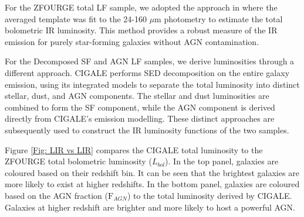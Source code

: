 For the ZFOURGE total LF sample, we adopted the approach in \cite{straatman_fourstar_2016} where the averaged \cite{wuyts_fireworks_2008} template was fit to the 24-160 $\mu$m photometry to estimate the total bolometric IR luminosity. This method provides a robust measure of the IR emission for purely star-forming galaxies without AGN contamination.

For the Decomposed SF and AGN LF samples, we derive luminosities through a different approach. CIGALE performs SED decomposition on the entire galaxy emission, using its integrated models to separate the total luminosity into distinct stellar, dust, and AGN components. The stellar and dust luminosities are combined to form the SF component, while the AGN component is derived directly from CIGALE's emission modelling. These distinct approaches are subsequently used to construct the IR luminosity functions of the two samples. 

Figure \ref{Fig: LIR vs LIR} compares the CIGALE total luminosity to the ZFOURGE total bolometric luminosity ($L_{bol}$). In the top panel, galaxies are coloured based on their redshift bin. It can be seen that the brightest galaxies are more likely to exist at higher redshifts. In the bottom panel, galaxies are coloured based on the AGN fraction ($\mathrm{F}_{AGN}$) to the total luminosity derived by CIGALE. Galaxies at higher redshift are brighter and more likely to host a powerful AGN.

